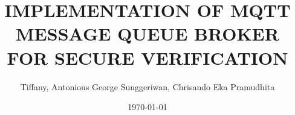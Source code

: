 \documentclass[a4paper,12pt,twoside,openright,openany]{report}
\title{IMPLEMENTATION OF MQTT MESSAGE QUEUE BROKER FOR SECURE VERIFICATION}
\author{Tiffany, Antonious George Sunggeriwan, Chrisando Eka Pramudhita}
\date{\today}
\begin{document}
        \maketitle
        \renewcommand{\baselinestretch}{1}\normalsize
        \tableofcontents
        \renewcommand{\baselinestretch}{1.5}\normalsize
        \clearpage
        \listoffigures
        
        
        
        
        

        
        
    
\end{document}
